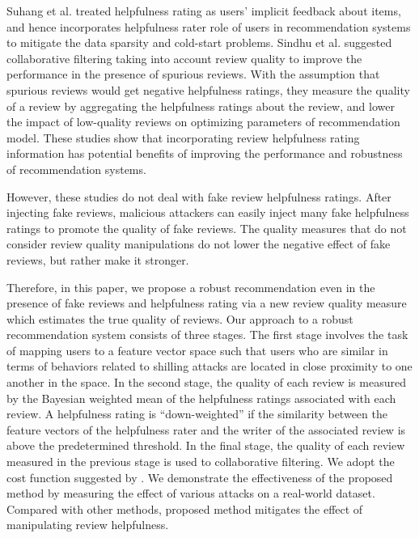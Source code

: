 \documentclass[master,english,final]{kaist-ucs}
\begin{document}
Suhang et al. \cite{DualRole} treated helpfulness rating as users’ implicit feedback about items, and hence incorporates helpfulness rater role of users in recommendation systems to mitigate the data sparsity and cold-start problems.
Sindhu et al. \cite{RQMF} suggested collaborative filtering taking into account review quality to improve the performance in the presence of spurious reviews.
With the assumption that spurious reviews would get negative helpfulness ratings, they measure the quality of a review by aggregating the helpfulness ratings about the review, and lower the impact of low-quality reviews on optimizing parameters of recommendation model.
These studies show that incorporating review helpfulness rating information has potential benefits of improving the performance and robustness of recommendation systems.

However, these studies do not deal with fake review helpfulness ratings.
After injecting fake reviews, malicious attackers can easily inject many fake helpfulness ratings to promote the quality of fake reviews.
The quality measures that do not consider review quality manipulations do not lower the negative effect of fake reviews, but rather make it stronger.

Therefore, in this paper, we propose a robust recommendation even in the presence of fake reviews and helpfulness rating via a new review quality measure which estimates the true quality of reviews.
Our approach to a robust recommendation system consists of three stages.
The first stage involves the task of mapping users to a feature vector space such that users who are similar in terms of behaviors related to shilling attacks are located in close proximity to one another in the space.
In the second stage, the quality of each review is measured by the Bayesian weighted mean of the helpfulness ratings associated with each review.
A helpfulness rating is “down-weighted” if the similarity between the feature vectors of the helpfulness rater and the writer of the associated review is above the predetermined threshold.
In the final stage, the quality of each review measured in the previous stage is used to collaborative filtering.
We adopt the cost function suggested by \cite{RQMF,ImplicitCF}.
We demonstrate the effectiveness of the proposed method by measuring the effect of various attacks on a real-world dataset.
Compared with other methods, proposed method mitigates the effect of manipulating review helpfulness.
\end{document}
